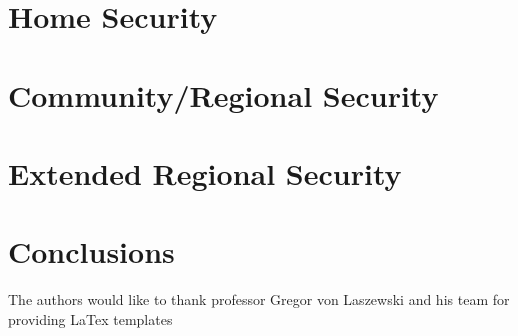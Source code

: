 \documentclass[sigconf]{acmart}
\begin{document}
\section{Home Security}

\section{Community/Regional Security}

\section{Extended Regional Security}

\section{Conclusions}

\begin{acks}
The authors would like to thank professor Gregor von Laszewski and his team for providing LaTex templates
\end{acks}


 
\end{document}
